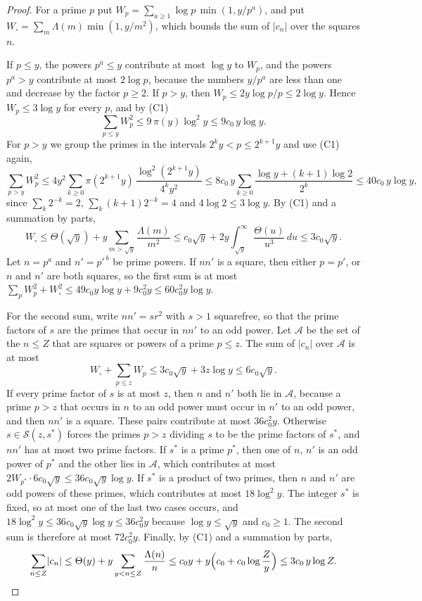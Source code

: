 \begin{proof}
For a prime $p$ put $W_p=\sum_{a\ge1}\log p\,\min(1,y/p^a)$, and put $W_\square=\sum_m\Lambda(m)\min(1,y/m^2)$, which bounds the sum of $\lvert c_n\rvert$ over the squares $n$.

If $p\le y$, the powers $p^a\le y$ contribute at most $\log y$ to $W_p$, and the powers $p^a>y$ contribute at most $2\log p$, because the numbers $y/p^a$ are less than one and decrease by the factor $p\ge2$. If $p>y$, then $W_p\le2y\log p/p\le2\log y$. Hence $W_p\le3\log y$ for every $p$, and by (C1)
\[
\sum_{p\le y}W_p^2\le9\,\pi(y)\log^2y\le9c_0\,y\log y .
\]
For $p>y$ we group the primes in the intervals $2^ky<p\le2^{k+1}y$ and use (C1) again,
\[
\sum_{p>y}W_p^2\le4y^2\sum_{k\ge0}\pi(2^{k+1}y)\,\frac{\log^2(2^{k+1}y)}{4^ky^2}\le8c_0\,y\sum_{k\ge0}\frac{\log y+(k+1)\log2}{2^k}\le40c_0\,y\log y ,
\]
since $\sum_k2^{-k}=2$, $\sum_k(k+1)2^{-k}=4$ and $4\log2\le3\log y$. By (C1) and a summation by parts,
\[
W_\square\le\Theta(\sqrt y)+y\sum_{m>\sqrt y}\frac{\Lambda(m)}{m^2}\le c_0\sqrt y+2y\int_{\sqrt y}^\infty\frac{\Theta(u)}{u^3}\,du\le3c_0\sqrt y .
\]
Let $n=p^a$ and $n'=p'^{\,b}$ be prime powers. If $nn'$ is a square, then either $p=p'$, or $n$ and $n'$ are both squares, so the first sum is at most $\sum_pW_p^2+W_\square^2\le49c_0y\log y+9c_0^2y\le60c_0^2y\log y$.

For the second sum, write $nn'=sr^2$ with $s>1$ squarefree, so that the prime factors of $s$ are the primes that occur in $nn'$ to an odd power. Let $\mathcal A$ be the set of the $n\le Z$ that are squares or powers of a prime $p\le z$. The sum of $\lvert c_n\rvert$ over $\mathcal A$ is at most
\[
W_\square+\sum_{p\le z}W_p\le3c_0\sqrt y+3z\log y\le6c_0\sqrt y .
\]
If every prime factor of $s$ is at most $z$, then $n$ and $n'$ both lie in $\mathcal A$, because a prime $p>z$ that occurs in $n$ to an odd power must occur in $n'$ to an odd power, and then $nn'$ is a square. These pairs contribute at most $36c_0^2y$. Otherwise $s\in\mathcal S(z,s^\ast)$ forces the primes $p>z$ dividing $s$ to be the prime factors of $s^\ast$, and $nn'$ has at most two prime factors. If $s^\ast$ is a prime $p^\ast$, then one of $n$, $n'$ is an odd power of $p^\ast$ and the other lies in $\mathcal A$, which contributes at most $2W_{p^\ast}\cdot6c_0\sqrt y\le36c_0\sqrt y\log y$. If $s^\ast$ is a product of two primes, then $n$ and $n'$ are odd powers of these primes, which contributes at most $18\log^2y$. The integer $s^\ast$ is fixed, so at most one of the last two cases occurs, and $18\log^2y\le36c_0\sqrt y\log y\le36c_0^2y$ because $\log y\le\sqrt y$ and $c_0\ge1$. The second sum is therefore at most $72c_0^2y$. Finally, by (C1) and a summation by parts,
\[
\sum_{n\le Z}\lvert c_n\rvert\le\Theta(y)+y\sum_{y<n\le Z}\frac{\Lambda(n)}n\le c_0y+y\Big(c_0+c_0\log\frac Zy\Big)\le3c_0\,y\log Z .\qedhere
\]
\end{proof}

